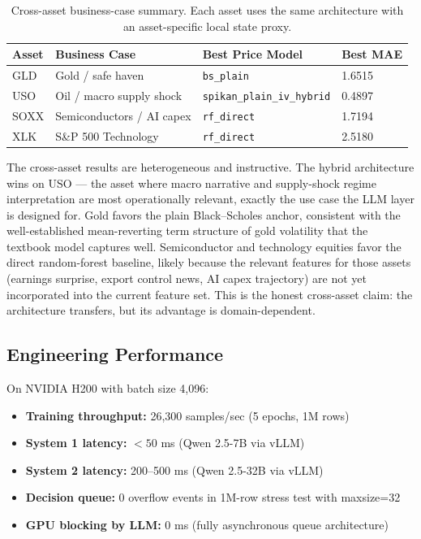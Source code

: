 \documentclass[11pt,a4paper]{article}
\begin{document}
\begin{table}[h]
\centering
\caption{Cross-asset business-case summary. Each asset uses the same architecture with an asset-specific local state proxy.}
\begin{tabular}{@{}llll@{}}
\toprule
Asset & Business Case & Best Price Model & Best MAE \\ \midrule
GLD & Gold / safe haven & \texttt{bs\_plain} & 1.6515 \\
USO & Oil / macro supply shock & \texttt{spikan\_plain\_iv\_hybrid} & 0.4897 \\
SOXX & Semiconductors / AI capex & \texttt{rf\_direct} & 1.7194 \\
XLK & S\&P 500 Technology & \texttt{rf\_direct} & 2.5180 \\ \bottomrule
\end{tabular}
\label{tab:cross_asset}
\end{table}

The cross-asset results are heterogeneous and instructive. The hybrid architecture wins on USO — the asset where macro narrative and supply-shock regime interpretation are most operationally relevant, exactly the use case the LLM layer is designed for. Gold favors the plain Black--Scholes anchor, consistent with the well-established mean-reverting term structure of gold volatility that the textbook model captures well. Semiconductor and technology equities favor the direct random-forest baseline, likely because the relevant features for those assets (earnings surprise, export control news, AI capex trajectory) are not yet incorporated into the current feature set. This is the honest cross-asset claim: the architecture transfers, but its advantage is domain-dependent.

\subsection{Engineering Performance}

On NVIDIA H200 with batch size 4,096:
\begin{itemize}
  \item \textbf{Training throughput:} 26,300 samples/sec (5 epochs, 1M rows)
  \item \textbf{System 1 latency:} $<50$ ms (Qwen 2.5-7B via vLLM)
  \item \textbf{System 2 latency:} 200--500 ms (Qwen 2.5-32B via vLLM)
  \item \textbf{Decision queue:} 0 overflow events in 1M-row stress test with maxsize=32
  \item \textbf{GPU blocking by LLM:} 0 ms (fully asynchronous queue architecture)
\end{itemize}
\end{document}
